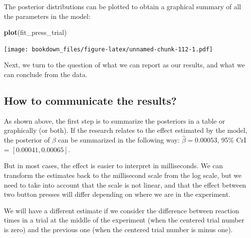 \documentclass[12pt,]{krantz}
\newenvironment{Shaded}{\begin{snugshade}}{\end{snugshade}}
\newcommand{\KeywordTok}[1]{\textcolor[rgb]{0.13,0.29,0.53}{\textbf{#1}}}
\newcommand{\DataTypeTok}[1]{\textcolor[rgb]{0.13,0.29,0.53}{#1}}
\newcommand{\DecValTok}[1]{\textcolor[rgb]{0.00,0.00,0.81}{#1}}
\newcommand{\StringTok}[1]{\textcolor[rgb]{0.31,0.60,0.02}{#1}}
\newcommand{\OperatorTok}[1]{\textcolor[rgb]{0.81,0.36,0.00}{\textbf{#1}}}
\newcommand{\NormalTok}[1]{#1}
\theoremstyle{definition}
\theoremstyle{definition}
\theoremstyle{definition}
\theoremstyle{remark}
\begin{document}
The posterior distributions can be plotted to obtain a graphical summary
of all the parameters in the model:

\begin{Shaded}
\begin{Highlighting}[]
\KeywordTok{plot}\NormalTok{(fit_press_trial)}
\end{Highlighting}
\end{Shaded}

\texttt{[image: bookdown\_files/figure-latex/unnamed-chunk-112-1.pdf]}

Next, we turn to the question of what we can report as our results, and
what we can conclude from the data.

\subsection{How to communicate the
results?}\label{how-to-communicate-the-results-1}

As shown above, the first step is to summarize the posteriors in a table
or graphically (or both). If the research relates to the effect
estimated by the model, the posterior of \(\beta\) can be summarized in
the following way: \(\hat\beta = 0.00053\), 95\% CrI =
\([ 0.00041 , 0.00065 ]\).

But in most cases, the effect is easier to interpret in milliseconds. We
can transform the estimates back to the millisecond scale from the log
scale, but we need to take into account that the scale is not linear,
and that the effect between two button presses will differ depending on
where we are in the experiment.

We will have a different estimate if we consider the difference between
reaction times in a trial at the middle of the experiment (when the
centered trial number is zero) and the previous one (when the centered
trial number is minus one).

\begin{Shaded}
\end{Shaded}
\end{document}
